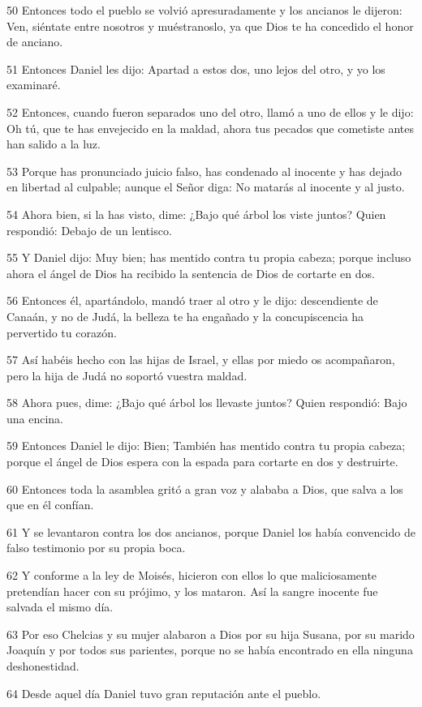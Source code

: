 \par 50 Entonces todo el pueblo se volvió apresuradamente y los ancianos le dijeron: Ven, siéntate entre nosotros y muéstranoslo, ya que Dios te ha concedido el honor de anciano.
\par 51 Entonces Daniel les dijo: Apartad a estos dos, uno lejos del otro, y yo los examinaré.
\par 52 Entonces, cuando fueron separados uno del otro, llamó a uno de ellos y le dijo: Oh tú, que te has envejecido en la maldad, ahora tus pecados que cometiste antes han salido a la luz.
\par 53 Porque has pronunciado juicio falso, has condenado al inocente y has dejado en libertad al culpable; aunque el Señor diga: No matarás al inocente y al justo.
\par 54 Ahora bien, si la has visto, dime: ¿Bajo qué árbol los viste juntos? Quien respondió: Debajo de un lentisco.
\par 55 Y Daniel dijo: Muy bien; has mentido contra tu propia cabeza; porque incluso ahora el ángel de Dios ha recibido la sentencia de Dios de cortarte en dos.
\par 56 Entonces él, apartándolo, mandó traer al otro y le dijo: descendiente de Canaán, y no de Judá, la belleza te ha engañado y la concupiscencia ha pervertido tu corazón.
\par 57 Así habéis hecho con las hijas de Israel, y ellas por miedo os acompañaron, pero la hija de Judá no soportó vuestra maldad.
\par 58 Ahora pues, dime: ¿Bajo qué árbol los llevaste juntos? Quien respondió: Bajo una encina.
\par 59 Entonces Daniel le dijo: Bien; También has mentido contra tu propia cabeza; porque el ángel de Dios espera con la espada para cortarte en dos y destruirte.
\par 60 Entonces toda la asamblea gritó a gran voz y alababa a Dios, que salva a los que en él confían.
\par 61 Y se levantaron contra los dos ancianos, porque Daniel los había convencido de falso testimonio por su propia boca.
\par 62 Y conforme a la ley de Moisés, hicieron con ellos lo que maliciosamente pretendían hacer con su prójimo, y los mataron. Así la sangre inocente fue salvada el mismo día.
\par 63 Por eso Chelcias y su mujer alabaron a Dios por su hija Susana, por su marido Joaquín y por todos sus parientes, porque no se había encontrado en ella ninguna deshonestidad.
\par 64 Desde aquel día Daniel tuvo gran reputación ante el pueblo.

